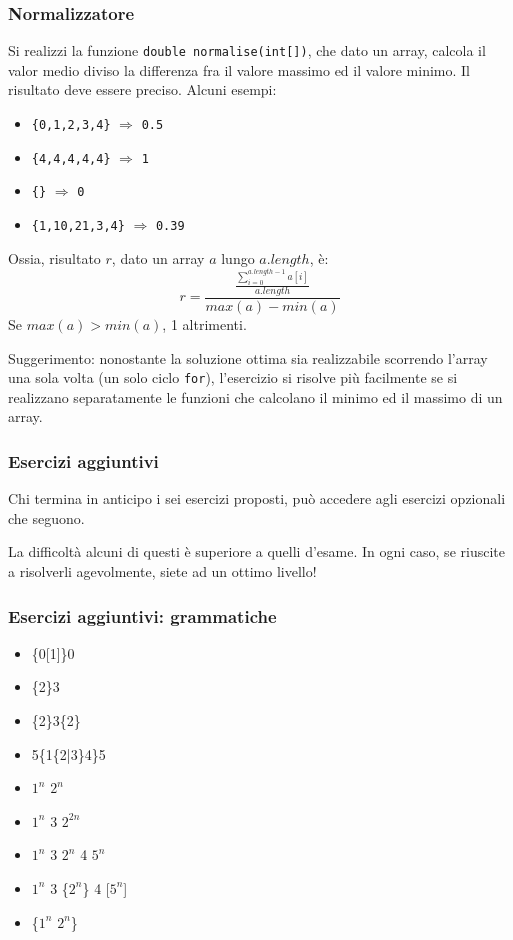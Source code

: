\documentclass{beamer}
\begin{document}
\begin{frame}[fragile]
\frametitle{Normalizzatore}
 Si realizzi la funzione \texttt{double normalise(int[])}, che dato un array, calcola il valor medio diviso la differenza fra il valore massimo ed il valore minimo. Il risultato deve essere preciso. Alcuni esempi:
\begin{itemize}
 \item \texttt{\{0,1,2,3,4\}} $\Rightarrow$ \texttt{0.5}
 \item \texttt{\{4,4,4,4,4\}} $\Rightarrow$ \texttt{1}
 \item \texttt{\{\}} $\Rightarrow$ \texttt{0}
 \item \texttt{\{1,10,21,3,4\}} $\Rightarrow$ \texttt{0.39}
\end{itemize}
Ossia, risultato $r$, dato un array $a$ lungo $a.length$, è:
$$
r = \frac{\frac{\sum_{i=0}^{a.length-1}a[i]}{a.length}}{max(a)-min(a)}
$$
Se $max(a) > min(a)$, 1 altrimenti.

Suggerimento: nonostante la soluzione ottima sia realizzabile scorrendo l'array una sola volta (un solo ciclo \texttt{for}), l'esercizio si risolve più facilmente se si realizzano separatamente le funzioni che calcolano il minimo ed il massimo di un array.
\end{frame}

\begin{frame}[fragile]
\frametitle{Esercizi aggiuntivi}
Chi termina in anticipo i sei esercizi proposti, può accedere agli esercizi opzionali che seguono.

La difficoltà alcuni di questi è superiore a quelli d'esame. In ogni caso, se riuscite a risolverli agevolmente, siete ad un ottimo livello!
\end{frame}

\begin{frame}[fragile]
\frametitle{Esercizi aggiuntivi: grammatiche}
\begin{itemize}
 \item \{0[1]\}0
 \item \{2\}3
 \item \{2\}3\{2\}
 \item 5\{1\{2|3\}4\}5
 \item $1^n$ $2^n$
 \item $1^n$ 3 $2^{2n}$
 \item $1^n$ 3 $2^n$ 4 $5^n$
 \item $1^n$ 3 \{$2^n$\} 4 [$5^n$]
 \item \{$1^n$ $2^n$\}
\end{itemize}
\end{frame}
\end{document}
